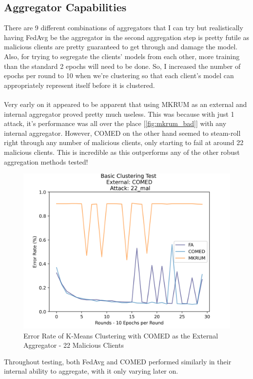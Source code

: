 \subsection{Aggregator Capabilities}
There are 9 different combinations of aggregators that I can try but realistically having FedAvg be the aggregator in the second aggregation step is pretty futile as malicious clients are pretty guaranteed to get through and damage the model.
Also, for trying to segregate the clients' models from each other, more training than the standard 2 epochs will need to be done.
So, I increased the number of epochs per round to 10 when we're clustering so that each client's model can appropriately represent itself before it is clustered.
\\ \\
Very early on it appeared to be apparent that using MKRUM as an external and internal aggregator proved pretty much useless.
This was because with just 1 attack, it's performance was all over the place [\ref{fig:mkrum_bad}] with any internal aggregator.
However, COMED on the other hand seemed to steam-roll right through any number of malicious clients, only starting to fail at around 22 malicious clients.
This is incredible as this outperforms any of the other robust aggregation methods tested!
\begin{figure}[htbp]
	\centering
    \includegraphics[scale=0.5]{my_agg/graphs/cluster_comed_22.png}
	\caption{Error Rate of K-Means Clustering with COMED as the External Aggregator - 22 Malicious Clients}
	\label{fig:comed_22}
\end{figure}
Throughout testing, both FedAvg and COMED performed similarly in their internal ability to aggregate, with it only varying later on.
